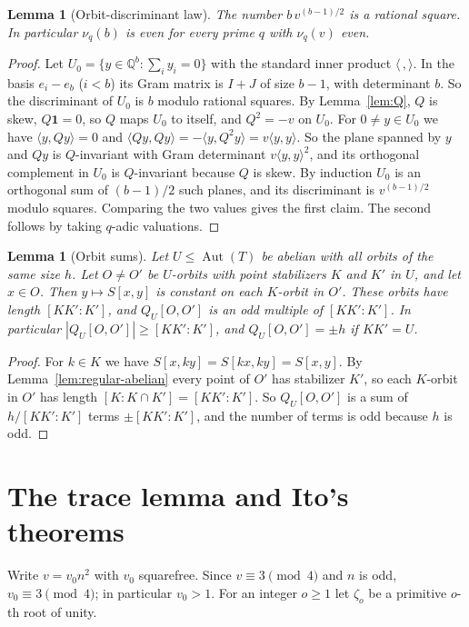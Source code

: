\documentclass[11pt]{amsart}
\newtheorem{lemma}[theorem]{Lemma}
\theoremstyle{definition}
\theoremstyle{remark}
\newcommand{\Q}{\mathbb{Q}}
\newcommand{\one}{\mathbf{1}}
\newcommand{\Aut}{\operatorname{Aut}}
\begin{document}
\begin{lemma}[Orbit-discriminant law]\label{lem:disc}
The number $b\,v^{(b-1)/2}$ is a rational square. In particular $\nu_q(b)$ is even for every prime $q$ with $\nu_q(v)$ even.
\end{lemma}
\begin{proof}
Let $U_0=\{y\in\Q^b:\sum_iy_i=0\}$ with the standard inner product $\langle\,,\rangle$. In the basis $e_i-e_b$ ($i<b$) its Gram matrix is $I+J$ of size $b-1$, with determinant $b$. So the discriminant of $U_0$ is $b$ modulo rational squares. By Lemma~\ref{lem:Q}, $Q$ is skew, $Q\one=0$, so $Q$ maps $U_0$ to itself, and $Q^2=-v$ on $U_0$. For $0\ne y\in U_0$ we have $\langle y,Qy\rangle=0$ and $\langle Qy,Qy\rangle=-\langle y,Q^2y\rangle=v\langle y,y\rangle$. So the plane spanned by $y$ and $Qy$ is $Q$-invariant with Gram determinant $v\langle y,y\rangle^2$, and its orthogonal complement in $U_0$ is $Q$-invariant because $Q$ is skew. By induction $U_0$ is an orthogonal sum of $(b-1)/2$ such planes, and its discriminant is $v^{(b-1)/2}$ modulo squares. Comparing the two values gives the first claim. The second follows by taking $q$-adic valuations.
\end{proof}

\begin{lemma}[Orbit sums]\label{lem:rowsum}
Let $U\le\Aut(T)$ be abelian with all orbits of the same size $h$. Let $O\ne O'$ be $U$-orbits with point stabilizers $K$ and $K'$ in $U$, and let $x\in O$. Then $y\mapsto S[x,y]$ is constant on each $K$-orbit in $O'$. These orbits have length $[KK':K']$, and $Q_U[O,O']$ is an odd multiple of $[KK':K']$. In particular $|Q_U[O,O']|\ge[KK':K']$, and $Q_U[O,O']=\pm h$ if $KK'=U$.
\end{lemma}
\begin{proof}
For $k\in K$ we have $S[x,ky]=S[kx,ky]=S[x,y]$. By Lemma~\ref{lem:regular-abelian} every point of $O'$ has stabilizer $K'$, so each $K$-orbit in $O'$ has length $[K:K\cap K']=[KK':K']$. So $Q_U[O,O']$ is a sum of $h/[KK':K']$ terms $\pm[KK':K']$, and the number of terms is odd because $h$ is odd.
\end{proof}

\section{The trace lemma and Ito's theorems}\label{sec:trace}

Write $v=v_0n^2$ with $v_0$ squarefree. Since $v\equiv3\pmod4$ and $n$ is odd, $v_0\equiv3\pmod4$; in particular $v_0>1$. For an integer $o\ge1$ let $\zeta_o$ be a primitive $o$-th root of unity.
\end{document}
